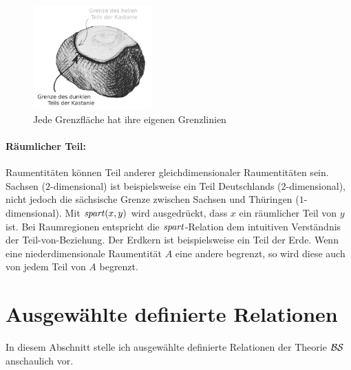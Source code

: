         \begin{figure}[ht]
            \centering
            \includegraphics[height=4cm]{abb/kastanie.png}
            \caption{Jede Grenzfläche hat ihre eigenen Grenzlinien}
            \label{fig:kastanie}
        \end{figure}
        
       
 \paragraph{Räumlicher Teil:}
       Raumentitäten
       können Teil anderer gleichdimensionaler Raumentitäten sein.
       Sachsen ($2$-dimensional) ist beispielsweise ein Teil Deutschlands ($2$-dimensional), nicht jedoch die sächsische Grenze zwischen Sachsen und Thüringen ($1$-dimensional).
       Mit $\mathit{spart}(x,y)$ wird ausgedrückt, dass $x$ ein räumlicher Teil von $y$ ist.
       Bei Raumregionen entspricht die $\mathit{spart}$-Relation dem intuitiven Verständnis der Teil-von-Beziehung. 
       Der Erdkern ist beispielsweise ein Teil der Erde.
       Wenn eine niederdimensionale Raumentität $A$ eine andere begrenzt, so wird diese auch von jedem Teil von $A$ begrenzt.
       


\section{Ausgewählte definierte Relationen}
In diesem Abschnitt stelle ich ausgewählte definierte Relationen der Theorie $\mathcal{BS}$ anschaulich vor. 

